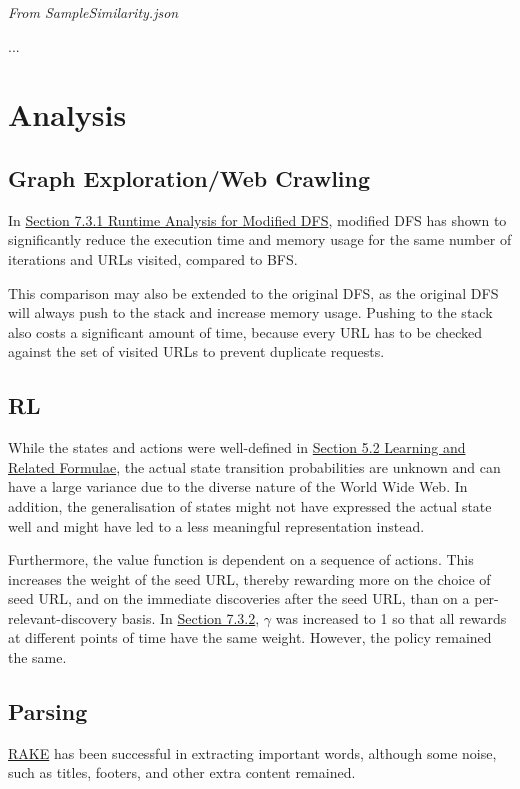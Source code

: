 \documentclass{article}
\begin{document}
\textit{From SampleSimilarity.json}

...
\newpage

\section{Analysis}
\begin{comment}
(Analyze and discuss the outcome in \hyperref[sec:6]{Section 6 Proposed Implementation}.)
\end{comment}

\subsection{Graph Exploration/Web Crawling}
In \hyperref[sec:7.3.1]{Section 7.3.1 Runtime Analysis for Modified DFS}, modified DFS has shown to significantly reduce the execution time and memory usage for the same number of iterations and URLs visited, compared to BFS.
\medskip

This comparison may also be extended to the original DFS, as the original DFS will always push to the stack and increase memory usage. Pushing to the stack also costs a significant amount of time, because every URL has to be checked against the set of visited URLs to prevent duplicate requests.

\subsection{RL}
While the states and actions were well-defined in \hyperref[sec:5.2]{Section 5.2 Learning and Related Formulae}, the actual state transition probabilities are unknown and can have a large variance due to the diverse nature of the World Wide Web. In addition, the generalisation of states might not have expressed the actual state well and might have led to a less meaningful representation instead.
\medskip

Furthermore, the value function is dependent on a sequence of actions. This increases the weight of the seed URL, thereby rewarding more on the choice of seed URL, and on the immediate discoveries after the seed URL, than on a per-relevant-discovery basis. In \hyperref[sec:7.3.2]{Section 7.3.2}, $ \gamma $ was increased to 1 so that all rewards at different points of time have the same weight. However, the policy remained the same.
\newpage

\subsection{Parsing}
\hyperref[sec:5.3]{RAKE} has been successful in extracting important words, although some noise, such as titles, footers, and other extra content remained.
\medskip
\end{document}
